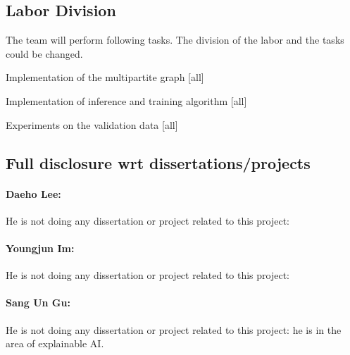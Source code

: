
\subsection{Labor Division}

The team will perform following tasks. The division of the labor and the tasks could be changed.
\bit
\item Implementation of the multipartite graph [all]
\item Implementation of inference and training algorithm [all]
\item Experiments on the validation data [all]
\eit

\subsection{Full disclosure wrt dissertations/projects}

\paragraph{Daeho Lee:}
He is not doing any dissertation or project related to this project: 

\paragraph{Youngjun Im:}
He is not doing any dissertation or project related to this project: 

\paragraph{Sang Un Gu:}
He is not doing any dissertation or project related to this project: he is in the area of explainable AI.
